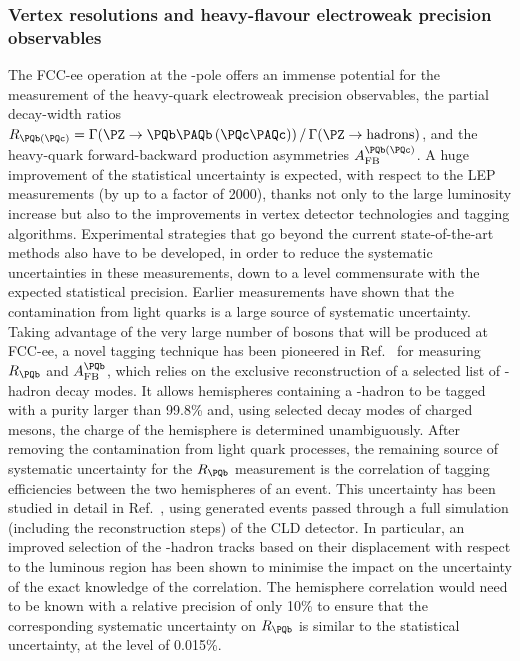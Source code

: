 \subsubsection{Vertex resolutions and heavy-flavour electroweak precision observables}
\label{sec:PhysPerf_HF_EWPO}

The FCC-ee operation at the \PZ-pole offers an immense potential for the measurement of the heavy-quark electroweak precision observables, 
the partial decay-width ratios $R_{\PQb (\PQc)} = \Gamma(\PZ \to \PQb \PAQb \, (\PQc \PAQc) ) \,/\, \Gamma(\PZ \to \text{hadrons})$, 
and the heavy-quark forward-backward production asymmetries $A_{\text{FB}}^{\PQb (\PQc)}$. 
A huge improvement of the statistical uncertainty is expected, with respect to the LEP measurements (by up to a factor of 2000), 
thanks not only to the large luminosity increase but also to the improvements in vertex detector technologies and tagging algorithms.
Experimental strategies that go beyond the current state-of-the-art methods also have to be developed, 
in order to reduce the systematic uncertainties in these measurements, down to a level commensurate with the expected statistical precision.
Earlier measurements have shown that the contamination from light quarks is a large source of systematic uncertainty. 
Taking advantage of the very large number of \PZ bosons that will be produced at FCC-ee, 
a novel tagging technique has been pioneered in Ref.~\cite{note_Lars} for measuring $R_{\PQb}$
and $A_{\text{FB}}^{\PQb}$, which relies on the exclusive reconstruction of a selected list of \PQb-hadron decay modes. 
It allows hemispheres containing a \PQb-hadron to be tagged with a purity larger than 99.8\% and, 
using selected decay modes of charged \PB mesons, the charge of the hemisphere is determined unambiguously. 
After removing the contamination from light quark processes, 
the remaining source of systematic uncertainty for the $R_{\PQb}$ measurement is the correlation of tagging efficiencies 
between the two hemispheres of an event. 
This uncertainty has been studied in detail in Ref.~\cite{note_Lars}, 
using generated events passed through a full simulation (including the reconstruction steps) of the CLD detector. 
In particular, an improved selection of the \PQb-hadron tracks based on their displacement with respect to the luminous region 
has been shown to minimise the impact on the  uncertainty of the exact knowledge of the correlation. 
The hemisphere correlation would need to be known with a relative precision of only 10\% 
to ensure that the corresponding systematic uncertainty on $R_{\PQb}$ is similar to the statistical uncertainty, at the level of 0.015\%. 
